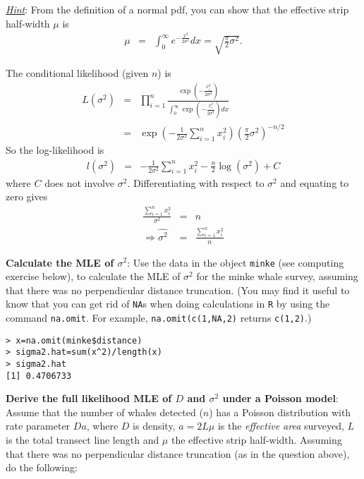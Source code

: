 \begin{questions}
\begin{parts}
\textit{\underline{Hint}}: From the definition of a normal pdf, you can show that the effective strip half-width $\mu$ is 
\begin{eqnarray*}
\mu&=&\int_0^\infty e^{-\frac{x^2}{2\sigma^2}}dx=\sqrt{\frac{\pi}{2}\sigma^2}.
\end{eqnarray*}

{\begin{solution}
The conditional likelihood (given $n$) is
\begin{eqnarray*}
L(\sigma^2)&=&\prod_{i=1}^n\frac{\exp\left(-\frac{x_i^2}{2\sigma^2}\right)}{\int_0^\infty\exp\left(-\frac{x_i^2}{2\sigma^2}\right)dx} \\
&=&\exp\left(-\frac{1}{2\sigma^2}\sum_{i=1}^nx_i^2\right)\left(\frac{\pi}{2}\sigma^2\right)^{-n/2}
\end{eqnarray*}
\noindent
So the log-likelihood is
\begin{eqnarray}
l(\sigma^2)&=&-\frac{1}{2\sigma^2}\sum_{i=1}^nx_i^2-\frac{n}{2}\log(\sigma^2)+C
\end{eqnarray}
\noindent
where $C$ does not involve $\sigma^2$.
Differentiating with respect to $\sigma^2$ and equating to zero gives
\begin{eqnarray}
\frac{\sum_{i=1}^nx_i^2}{\sigma^2}&=&n \nonumber \\
\Rightarrow\widehat{\sigma^2}&=&\frac{\sum_{i=1}^nx_i^2}{n} \nonumber
\end{eqnarray}
\end{solution}}

\item \textbf{Calculate the MLE of $\sigma^2$}: Use the data in the object \verb|minke| (see computing exercise below), to calculate the MLE of $\sigma^2$ for the minke whale survey, assuming that there was no perpendicular distance truncation. (You may find it useful to know that you can get rid of \verb|NA|s when doing calculations in \verb|R| by using the command \verb|na.omit|. For example, \verb|na.omit(c(1,NA,2)| returns \verb|c(1,2)|.)

{\begin{solution}
\begin{verbatim}
> x=na.omit(minke$distance)
> sigma2.hat=sum(x^2)/length(x)
> sigma2.hat
[1] 0.4706733
\end{verbatim}
\end{solution}}

\item\textbf{Derive the full likelihood MLE of $D$ and $\sigma^2$ under a Poisson model}: Assume that the number of whales detected ($n$) has a Poisson distribution with rate parameter $Da$, where $D$ is density, $a=2L\mu$ is the \textit{effective area} surveyed, $L$ is the total transect line length and $\mu$ the effective strip half-width. Assuming that there was no perpendicular distance truncation (as in the question above), do the following:


\end{parts}
\end{questions}
